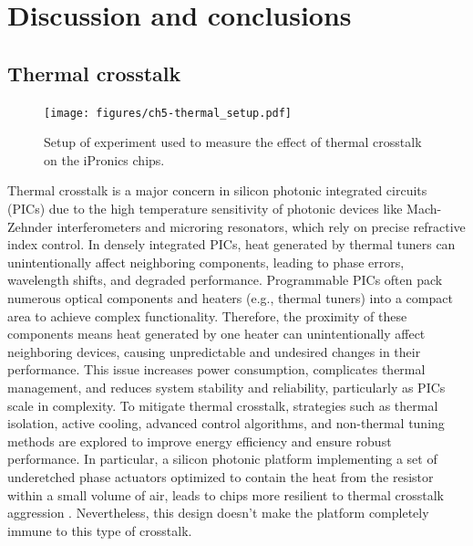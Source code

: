 
\chapter{Discussion and conclusions}\label{chap:discussion_and_conclusions} %

\section{Thermal crosstalk}\label{sec:thermal_crosstalk} %

\begin{figure}
	\begin{center}
		\texttt{[image: figures/ch5-thermal\_setup.pdf]}
	\end{center}
	\caption{Setup of experiment used to measure the effect of thermal crosstalk on the iPronics chips.}\label{fig:ch5-thermal_setup}
\end{figure}

Thermal crosstalk is a major concern in silicon photonic integrated circuits (PICs) due to the high temperature sensitivity of photonic devices like Mach-Zehnder interferometers and microring resonators, which rely on precise refractive index control.
In densely integrated PICs, heat generated by thermal tuners can unintentionally affect neighboring components, leading to phase errors, wavelength shifts, and degraded performance.
Programmable PICs often pack numerous optical components and heaters (e.g., thermal tuners) into a compact area to achieve complex functionality.
Therefore, the proximity of these components means heat generated by one heater can unintentionally affect neighboring devices, causing unpredictable and undesired changes in their performance.
This issue increases power consumption, complicates thermal management, and reduces system stability and reliability, particularly as PICs scale in complexity.
To mitigate thermal crosstalk, strategies such as thermal isolation, active cooling, advanced control algorithms, and non-thermal tuning methods are explored to improve energy efficiency and ensure robust performance.
In particular, a silicon photonic platform implementing a set of underetched phase actuators optimized to contain the heat from the resistor within a small volume of air, leads to chips more resilient to thermal crosstalk aggression \cite{liu_thermo-optic_2022}.
Nevertheless, this design doesn't make the platform completely immune to this type of crosstalk.

